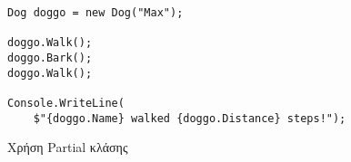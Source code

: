 \begin{listing}[htbp]
\begin{verbatim}
Dog doggo = new Dog("Max");

doggo.Walk();
doggo.Bark();
doggo.Walk();

Console.WriteLine(
    $"{doggo.Name} walked {doggo.Distance} steps!");
\end{verbatim}
\caption{Χρήση Partial κλάσης}
\label{PartialExec}
\end{listing}